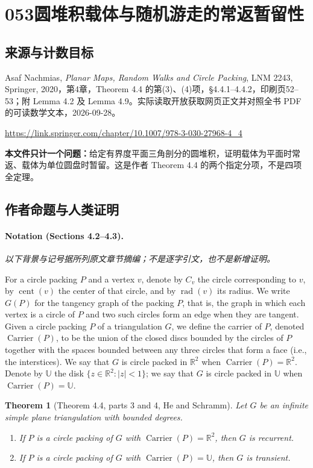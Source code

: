 \documentclass[UTF8,11pt]{ctexart}
\newtheorem*{theorem}{Theorem}
\theoremstyle{definition}
\newcommand{\R}{\mathbb R}
\begin{document}
\section*{053\quad 圆堆积载体与随机游走的常返暂留性}
\subsection*{来源与计数目标}
Asaf Nachmias, \emph{Planar Maps, Random Walks and Circle Packing}, LNM 2243, Springer, 2020，第4章，Theorem 4.4 的第(3)、(4)项，\S4.4.1--4.4.2，印刷页52--53；附 Lemma 4.2 及 Lemma 4.9。实际读取开放获取网页正文并对照全书 PDF 的可读数学文本，2026-09-28。
\par\url{https://link.springer.com/chapter/10.1007/978-3-030-27968-4_4}
\par\textbf{本文件只计一个问题：}给定有界度平面三角剖分的圆堆积，证明载体为平面时常返、载体为单位圆盘时暂留。这是作者 Theorem 4.4 的两个指定分项，不是四项全定理。
\subsection*{作者命题与人类证明}
\paragraph{Notation (Sections 4.2--4.3).}
\noindent\textit{以下背景与记号据所列原文章节摘编；不是逐字引文，也不是新增证明。}\par
For a circle packing $P$ and a vertex $v$, denote by $C_v$ the circle corresponding to $v$, by $\operatorname{cent}(v)$ the center of that circle, and by $\operatorname{rad}(v)$ its radius. We write $G(P)$ for the tangency graph of the packing $P$, that is, the graph in which each vertex is a circle of $P$ and two such circles form an edge when they are tangent.
Given a circle packing $P$ of a triangulation $G$, we define the carrier of $P$, denoted $\operatorname{Carrier}(P)$, to be the union of the closed discs bounded by the circles of $P$ together with the spaces bounded between any three circles that form a face (i.e., the interstices). We say that $G$ is circle packed in $\R^2$ when $\operatorname{Carrier}(P)=\R^2$. Denote by $\mathbb U$ the disk $\{z\in\R^2:|z|<1\}$; we say that $G$ is circle packed in $\mathbb U$ when $\operatorname{Carrier}(P)=\mathbb U$.

\begin{theorem}[Theorem 4.4, parts 3 and 4, He and Schramm]
Let $G$ be an infinite simple plane triangulation with bounded degrees.
\begin{enumerate}[label=(\arabic*),start=3]
\item If $P$ is a circle packing of $G$ with $\operatorname{Carrier}(P)=\R^2$, then $G$ is recurrent.
\item If $P$ is a circle packing of $G$ with $\operatorname{Carrier}(P)=\mathbb U$, then $G$ is transient.
\end{enumerate}
\end{theorem}
\end{document}
